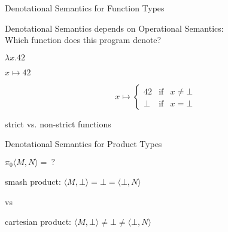 \documentclass{beamer}
\begin{document}
\begin{frame}[fragile]{Denotational Semantics for Function Types}

Denotational Semantics depends on Operational Semantics:\\
Which function does this program denote?

\begin{center}

\onslide<+->
$\lambda x . 42$
\vspace{2em}

\onslide<+->
$x \mapsto 42$

\begin{equation*}
x \mapsto \left\{
  \begin{array}{lcl}
   42    & \text{if} & x \neq \bot \\
   \bot  & \text{if} & x = \bot
  \end{array}
\right.
\end{equation*}

\vspace{2em}
strict vs. non-strict functions

\end{center}

\end{frame}



\begin{frame}{Denotational Semantics for Product Types}

\onslide<+->
\begin{center}
$\pi_0 \langle M,N \rangle =\ ?$
\vspace{2em}

\onslide<+->
smash product: $\langle M, \bot\rangle = \bot = \langle\bot, N\rangle$

vs

cartesian product: $\langle M, \bot\rangle \neq \bot \neq \langle\bot, N\rangle$

\end{center}

\end{frame}
\end{document}

